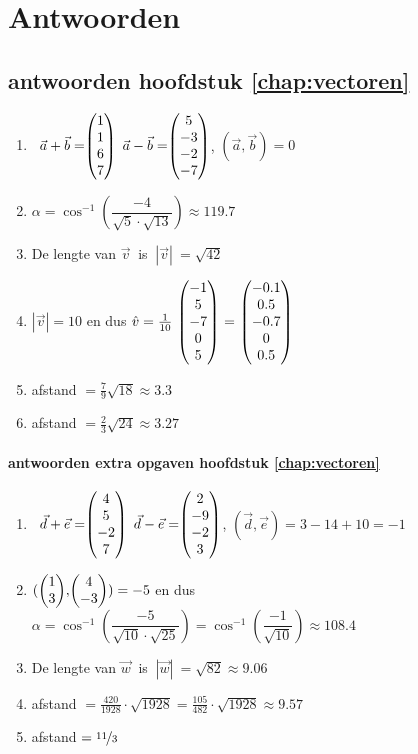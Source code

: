 \chapter{Antwoorden}

\section{antwoorden  hoofdstuk \ref{chap:vectoren}}
\begin{enumerate}
	\item   \ $ \vec{a} + \vec{b}  = \vecvier{1}{1}{6}{7} $   \qquad $ \vec{a} - \vec{b} = \vecvier{5}{-3}{-2}{-7} $,   \qquad $  (\vec{a} , \vec{b}) = 0 $ 
	
	
	\item  $\alpha = \cos ^{-1} \left(\dfrac{-4}{\sqrt{5}\cdot\sqrt{13}}\right) \approx 119.7 $ 
	
	\item De lengte van  $  \vec{v} \ $ is $ \ |\vec{v}| \  =  \sqrt{42}$
	
	\item $|\vec{v}| = 10$ en dus $ \hat{v} = \frac{1}{10}\  \vecvijf{-1}{5}{-7}{0}{5} \  = \  \vecvijf{-0.1}{0.5}{-0.7}{0}{0.5} $
	
	\item afstand  $ = \frac{7}{9}\sqrt{18} \approx 3.3 $

    \item afstand  $ = \frac{2}{3}\sqrt{24} \approx 3.27 $
\end{enumerate}

\subsubsection{antwoorden extra opgaven hoofdstuk \ref{chap:vectoren}}
\begin{enumerate}
	
	\item  \ $ \vec{d} + \vec{e}  = \vecvier{4}{5}{-2}{7} $   \qquad $ \vec{d} - \vec{e} = \vecvier{2}{-9}{-2}{3} $,   \qquad $  (\vec{d} , \vec{e}) = 3-14+10 = -1 $ 
	
	\item $  (\vectwee{1}{3} , \vectwee{4}{-3}) = -5 $  en dus $\alpha = \cos ^{-1} \left(\dfrac{-5}{\sqrt{10}\cdot\sqrt{25}}\right)= \cos ^{-1} \left(\dfrac{-1}{\sqrt{10}}\right) \approx 108.4 $ 
	
	\item De lengte van  $  \vec{w} \ $ is $ \ |\vec{w}| \  =  \sqrt{82} \approx 9.06 $
	
	\item afstand  $ = \frac{420}{1928}\cdot\sqrt{1928} = \frac{105}{482}\cdot\sqrt{1928} \approx 9.57 $
	
	\item    afstand  $ = \nicefrac{11}{3} $
\end{enumerate}	

